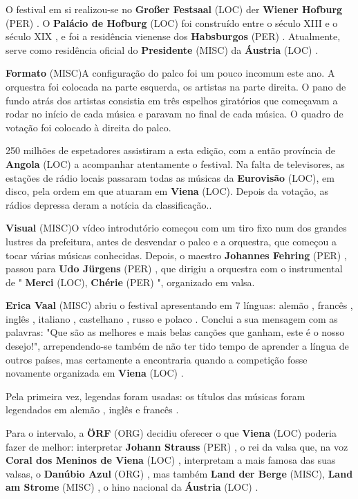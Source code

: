 \documentclass[12pt,a4paper]{article}
\begin{document}
O festival em si realizou-se no \textbf{Großer Festsaal} (LOC) der \textbf{Wiener Hofburg} (PER) . O \textbf{Palácio de Hofburg} (LOC) foi construído entre o século XIII e o século XIX , e foi a residência vienense dos \textbf{Habsburgos} (PER) . Atualmente, serve como residência oficial do \textbf{Presidente} (MISC) da \textbf{Áustria} (LOC) .



\textbf{Formato} (MISC)A configuração do palco foi um pouco incomum este ano. A orquestra foi colocada na parte esquerda, os artistas na parte direita. O pano de fundo atrás dos artistas consistia em três espelhos giratórios que começavam a rodar no início de cada música e paravam no final de cada música. O quadro de votação foi colocado à direita do palco.

250 milhões de espetadores assistiram a esta edição, com a então província de \textbf{Angola} (LOC) a acompanhar atentamente o festival. Na falta de televisores, as estações de rádio locais passaram todas as músicas da \textbf{Eurovisão} (LOC), em disco, pela ordem em que atuaram em \textbf{Viena} (LOC). Depois da votação, as rádios depressa deram a notícia da classificação..



\textbf{Visual} (MISC)O vídeo introdutório começou com um tiro fixo num dos grandes lustres da prefeitura, antes de desvendar o palco e a orquestra, que começou a tocar várias músicas conhecidas. Depois, o maestro \textbf{Johannes Fehring} (PER) , passou para \textbf{Udo Jürgens} (PER) , que dirigiu a orquestra com o instrumental de " \textbf{Merci} (LOC), \textbf{Chérie} (PER) ", organizado em valsa.

\textbf{Erica Vaal} (MISC) abriu o festival apresentando em 7 línguas: alemão , francês , inglês , italiano , castelhano , russo e polaco . Conclui a sua mensagem com as palavras: "Que são as melhores e mais belas canções que ganham, este é o nosso desejo!", arrependendo-se também de não ter tido tempo de aprender a língua de outros países, mas certamente a encontraria quando a competição fosse novamente organizada em \textbf{Viena} (LOC) .

Pela primeira vez, legendas foram usadas: os títulos das músicas foram legendados em alemão , inglês e francês .

Para o intervalo, a \textbf{ÖRF} (ORG) decidiu oferecer o que \textbf{Viena} (LOC) poderia fazer de melhor: interpretar \textbf{Johann Strauss} (PER) , o rei da valsa que, na voz \textbf{Coral dos Meninos de Viena} (LOC) , interpretam a mais famosa das suas valsas, o \textbf{Danúbio Azul} (ORG) , mas também \textbf{Land der Berge} (MISC), \textbf{Land am Strome} (MISC) , o hino nacional da \textbf{Áustria} (LOC) .
\end{document}
